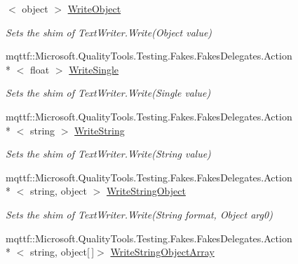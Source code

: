 \begin{DoxyCompactItemize}
$<$ object $>$ \hyperlink{class_system_1_1_i_o_1_1_fakes_1_1_shim_text_writer_ae757c9edec3e6f8933f64eef78bbfecb}{Write\-Object}
\begin{DoxyCompactList}\small\item\em Sets the shim of Text\-Writer.\-Write(\-Object value)\end{DoxyCompactList}\item 
mqttf\-::\-Microsoft.\-Quality\-Tools.\-Testing.\-Fakes.\-Fakes\-Delegates.\-Action\\*
$<$ float $>$ \hyperlink{class_system_1_1_i_o_1_1_fakes_1_1_shim_text_writer_a5447da9d571f02ac71a121d7b970feed}{Write\-Single}
\begin{DoxyCompactList}\small\item\em Sets the shim of Text\-Writer.\-Write(\-Single value)\end{DoxyCompactList}\item 
mqttf\-::\-Microsoft.\-Quality\-Tools.\-Testing.\-Fakes.\-Fakes\-Delegates.\-Action\\*
$<$ string $>$ \hyperlink{class_system_1_1_i_o_1_1_fakes_1_1_shim_text_writer_adcd47a26932043aeea2938741f8f602d}{Write\-String}
\begin{DoxyCompactList}\small\item\em Sets the shim of Text\-Writer.\-Write(\-String value)\end{DoxyCompactList}\item 
mqttf\-::\-Microsoft.\-Quality\-Tools.\-Testing.\-Fakes.\-Fakes\-Delegates.\-Action\\*
$<$ string, object $>$ \hyperlink{class_system_1_1_i_o_1_1_fakes_1_1_shim_text_writer_a432bbf819d948be0f9e6daca5bef02c5}{Write\-String\-Object}
\begin{DoxyCompactList}\small\item\em Sets the shim of Text\-Writer.\-Write(\-String format, Object arg0)\end{DoxyCompactList}\item 
mqttf\-::\-Microsoft.\-Quality\-Tools.\-Testing.\-Fakes.\-Fakes\-Delegates.\-Action\\*
$<$ string, object\mbox{[}$\,$\mbox{]}$>$ \hyperlink{class_system_1_1_i_o_1_1_fakes_1_1_shim_text_writer_a41ff13cf276d67c2d94466dc376581ba}{Write\-String\-Object\-Array}

\end{DoxyCompactItemize}
